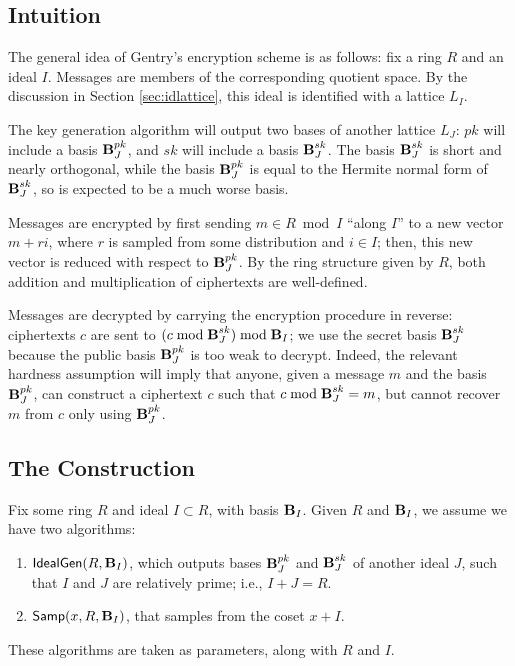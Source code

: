\subsection{Intuition}
The general idea of Gentry's encryption scheme is as follows: fix a ring $R$ and an ideal $I$. Messages are members of the corresponding quotient space. By the discussion in Section \ref{sec:idlattice}, this ideal is identified with a lattice $L_I$.

The key generation algorithm will output two bases of another lattice $L_J$: $pk$ will include a basis $\textbf{B}_J^{pk}$, and $sk$ will include a basis $\textbf{B}_J^{sk}$. The basis $\textbf{B}_J^{sk}$ is short and nearly orthogonal, while the basis $\textbf{B}_J^{pk}$ is equal to the Hermite normal form of $\textbf{B}_J^{sk}$, so is expected to be a much worse basis.

Messages are encrypted by first sending $m \in R \bmod I$ ``along $I$'' to a new vector $m + ri$, where $r$ is sampled from some distribution and $i \in I$; then, this new vector is reduced with respect to $\textbf{B}_J^{pk}$. By the ring structure given by $R$, both addition and multiplication of ciphertexts are well-defined.

Messages are decrypted by carrying the encryption procedure in reverse: ciphertexts $c$ are sent to $(c \bmod \textbf{B}_J^{sk}) \bmod \textbf{B}_I$; we use the secret basis $\textbf{B}_J^{sk}$ because the public basis $\textbf{B}_J^{pk}$ is too weak to decrypt. Indeed, the relevant hardness assumption will imply that anyone, given a message $m$ and the basis $\textbf{B}_J^{pk}$, can construct a ciphertext $c$ such that $c \bmod \text{\textbf{B}}_J^{sk} = m$, but cannot recover $m$ from $c$ only using $\textbf{B}_J^{pk}$.

\subsection{The Construction}

Fix some ring $R$ and ideal $I \subset R$, with basis $\textbf{B}_I$. Given $R$ and $\textbf{B}_I$, we assume we have two algorithms:
\begin{enumerate}
    \item ${\sf IdealGen}(R, \textbf{B}_I)$, which outputs bases $\textbf{B}_J^{pk}$ and $\textbf{B}_J^{sk}$ of another ideal $J$, such that $I$ and $J$ are relatively prime; i.e., $I + J = R$.
    \item  ${\sf Samp}(x, R, \textbf{B}_I)$, that samples from the coset $x + I$.
\end{enumerate}

These algorithms are taken as parameters, along with $R$ and $I$.

